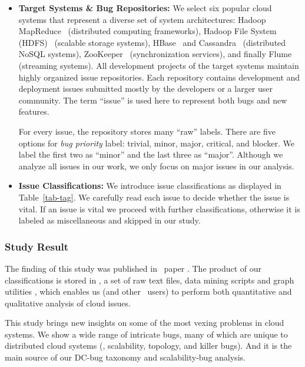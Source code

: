 \begin{itemize}

\item {\bf Target Systems \& Bug Repositories:} We select six popular cloud
systems that represent a diverse set of system architectures: Hadoop
MapReduce~\cite{HadoopWeb} (distributed computing frameworks), Hadoop File
System (HDFS)~\cite{HDFSWeb} (scalable storage systems), HBase~\cite{HBaseWeb}
and Cassandra~\cite{CassandraWeb} (distributed NoSQL systems),
ZooKeeper~\cite{ZooKeeperWeb} (synchronization services), and finally
Flume~\cite{FlumeWeb} (streaming systems).
%
All development projects of the target systems maintain highly organized issue
repositories.
%
Each repository contains development and deployment issues submitted mostly by
the developers or a larger user community. The term ``issue'' is used here to
represent both bugs and new features.

For every issue, the repository stores many ``raw'' labels. There are five
options for {\em bug priority} label: trivial, minor, major, critical, and
blocker. We label the first two as ``minor'' and the last three as ``major''.
Although we analyze all issues in our work, we only focus on major issues in
our analysis.
\fi

\item {\bf Issue Classifications:} We introduce issue classifications as
displayed in Table~\ref{tab-tag}. 
%
We carefully read each issue to decide whether the issue is vital. If an issue
is vital we proceed with further classifications, otherwise it is labeled as
miscellaneous and skipped in our study. 

\end{itemize}

\subsubsection{Study Result}

The finding of this study was published in \cbs\ paper \cite{Gunawi+14-Cbs}.  The
product of our classifications is stored in \cdb, a set of raw text files, data
mining scripts and graph utilities \cite{CBS}, which enables us (and other \cdb\
users) to perform both quantitative and qualitative analysis of cloud issues. 

This study brings new insights on some of the most vexing problems in cloud
systems. We show a wide range of intricate bugs, many of which are unique to
distributed cloud systems (\eg, scalability, topology, and killer bugs). And it
is the main source of our DC-bug taxonomy and scalability-bug analysis.


